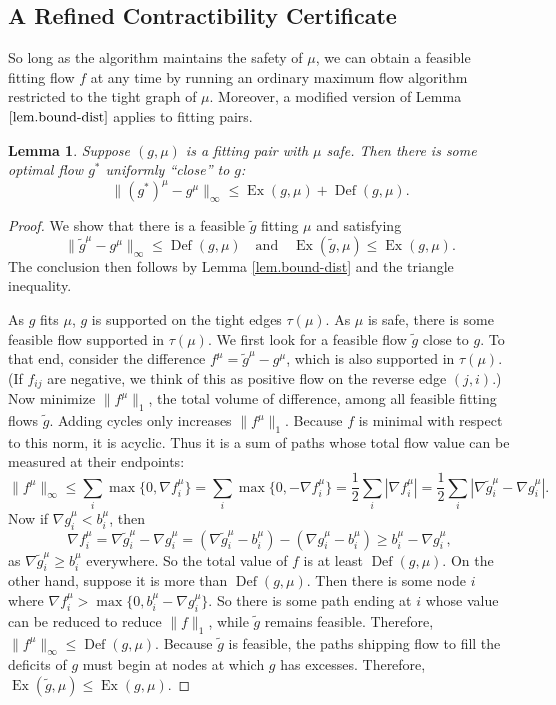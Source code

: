 \documentclass[11pt]{article}
\newtheorem{lemma}[theorem]{Lemma}
\theoremstyle{definition}
\theoremstyle{definition}
\theoremstyle{definition}
\newcommand{\fu}{f^{\mu}}
\newcommand{\nfiu}{\nabla \fu_i}
\newcommand{\biu}{b_{i}^{\mu}}
\DeclareMathOperator{\Ex}{Ex}
\DeclareMathOperator{\Def}{Def}
\begin{document}
    \subsection{A Refined Contractibility Certificate}
    So long as the algorithm maintains the safety of $\mu$,
    we can obtain a feasible fitting flow $f$ at any time
    by running an ordinary maximum flow algorithm restricted to the tight graph of $\mu$.
    Moreover, a modified version of Lemma $\ref{lem.bound-dist}$ applies to fitting
    pairs.
    \begin{lemma} \label{lem.bound-dist2}
    Suppose $(g, \mu)$ is a fitting pair with $\mu$ safe. Then there is some optimal flow $g^*$
    uniformly ``close'' to $g$:
    \[ \|(g^*)^\mu - g^\mu\|_\infty \leq \Ex(g, \mu) + \Def(g, \mu). \]
    \end{lemma}
    \begin{proof}
    We show that there is a feasible $\tilde{g}$ fitting $\mu$ and satisfying
    \[ \|\tilde{g}^\mu - g^\mu\|_\infty \leq \Def(g, \mu) \quad \text{and} \quad
       \Ex(\tilde{g}, \mu) \leq \Ex(g, \mu). \]
    The conclusion then follows by Lemma \ref{lem.bound-dist} and the triangle inequality.
    
	As $g$ fits $\mu$, $g$ is supported on the tight edges $\tau(\mu)$. As
	$\mu$ is safe, there is some feasible flow supported in $\tau(\mu)$. We first
    look for a feasible flow $\tilde{g}$ close to $g$. To that end, consider the
    difference $f^\mu = \tilde{g}^\mu - g^\mu$, which is also supported in $\tau(\mu)$.
    (If $f_{ij}$ are negative, we think of this as positive flow on the reverse edge $(j, i)$.)
    Now minimize $\|f^\mu\|_1$, the total volume of difference,
    among all feasible fitting flows $\tilde{g}$. Adding cycles only increases $\|f^\mu\|_1$.
    Because $f$ is minimal with respect to this norm, it is acyclic. Thus it is a sum of
    paths whose total flow value can be measured at their endpoints:
    \[ \|f^\mu\|_\infty \leq \sum_i \max\{0, \nfiu\} = \sum_i \max\{0, -\nfiu\} = \frac{1}{2}\sum_i |\nfiu|
     = \frac{1}{2}\sum_i |\nabla \tilde{g}^\mu_i - \nabla g^\mu_i|. \]
    Now if $\nabla g_i^\mu < b_i^\mu$, then
    \[ \nfiu = \nabla \tilde{g}_i^\mu - \nabla g_i^\mu
     = (\nabla \tilde{g}_i^\mu - b_i^\mu) - (\nabla g_i^\mu - b_i^\mu) \geq b_i^\mu - \nabla g_i^\mu, \]
    as $\nabla \tilde{g}_i^\mu \geq b_i^\mu$ everywhere. So the total value of $f$ is at least
    $\Def(g, \mu)$. On the other hand, suppose it is more than $\Def(g, \mu)$. Then there
    is some node $i$ where $\nfiu > \max\{0, \biu - \nabla g_i^\mu\}$. So there is some path
    ending at $i$ whose value can be reduced to reduce $\|f\|_1$, while $\tilde{g}$
    remains feasible. Therefore, $\|f^\mu\|_\infty \leq \Def(g, \mu)$. Because $\tilde{g}$ is feasible,
    the paths shipping flow to fill the deficits of $g$ must begin at nodes at which $g$ has
    excesses. Therefore, $\Ex(\tilde{g}, \mu) \leq \Ex(g, \mu)$.
    \end{proof}
    
\end{document}
